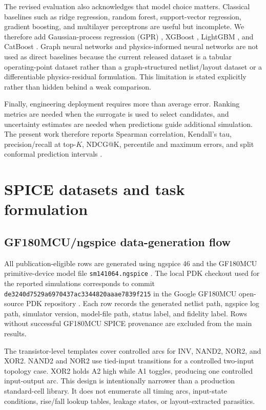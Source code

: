 \documentclass[preprint,12pt]{elsarticle}
\begin{document}
The revised evaluation also acknowledges that model choice matters. Classical baselines such as ridge regression, random forest, support-vector regression, gradient boosting, and multilayer perceptrons are useful but incomplete. We therefore add Gaussian-process regression (GPR) \cite{Rasmussen_Williams_GPML_2006}, XGBoost \cite{Chen_XGBoost_KDD_2016}, LightGBM \cite{Ke_LightGBM_NIPS_2017}, and CatBoost \cite{Prokhorenkova_CatBoost_NeurIPS_2018}. Graph neural networks and physics-informed neural networks are not used as direct baselines because the current released dataset is a tabular operating-point dataset rather than a graph-structured netlist/layout dataset or a differentiable physics-residual formulation. This limitation is stated explicitly rather than hidden behind a weak comparison.

Finally, engineering deployment requires more than average error. Ranking metrics are needed when the surrogate is used to select candidates, and uncertainty estimates are needed when predictions guide additional simulation. The present work therefore reports Spearman correlation, Kendall's tau, precision/recall at top-$K$, NDCG@K, percentile and maximum errors, and split conformal prediction intervals \cite{Vovk_Conformal_2005,Angelopoulos_Bates_Conformal_2021}.

\section{SPICE datasets and task formulation}

\subsection{GF180MCU/ngspice data-generation flow}

All publication-eligible rows are generated using ngspice 46 and the GF180MCU primitive-device model file \texttt{sm141064.ngspice} \cite{Ngspice_Manual,GF180MCU_Model_sm141064,GF180MCU_ReadTheDocs_CustomDesign}. The local PDK checkout used for the reported simulations corresponds to commit \texttt{de3240d7529a6970437ac3344820aaae7839f215} in the Google GF180MCU open-source PDK repository \cite{Google_GF180MCU_PDK_GitHub}. Each row records the generated netlist path, ngspice log path, simulator version, model-file path, status label, and fidelity label. Rows without successful GF180MCU SPICE provenance are excluded from the main results.

The transistor-level templates cover controlled arcs for INV, NAND2, NOR2, and XOR2. NAND2 and NOR2 use tied-input transitions for a controlled two-input topology case. XOR2 holds A2 high while A1 toggles, producing one controlled input-output arc. This design is intentionally narrower than a production standard-cell library. It does not enumerate all timing arcs, input-state conditions, rise/fall lookup tables, leakage states, or layout-extracted parasitics.
\end{document}
